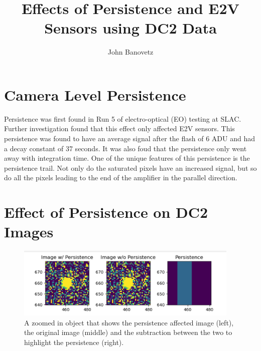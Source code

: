 \documentclass[DM,authoryear,toc]{lsstdoc}
\title{Effects of Persistence and E2V Sensors using DC2 Data}
\author{%
John Banovetz
}
\date{\vcsDate}
\begin{document}
\maketitle


\section{Camera Level Persistence}
Persistence was first found in Run 5 of electro-optical (EO) testing at SLAC. Further investigation found that this effect only affected E2V sensors. 
This persistence was found to have an average signal after the flash of 6 ADU and had a decay constant of 37 seconds. 
It was also foud that the persistence only went away with integration time. One of the unique features of this persistence is the persistence trail. 
Not only do the saturated pixels have an increased signal, but so do all the pixels leading to the end of the amplifier in the parallel direction.


\section{Effect of Persistence on DC2 Images}

\begin{figure}[!htp]
  \centering
  \includegraphics[width=0.95\textwidth, angle=0]{Obj_pers.png}
  \caption{
  A zoomed in object that shows the persistence affected image (left), the original image (middle) 
  and the subtraction between the two to highlight the persistence (right).
  }\label{fig:ex_persistence}
\end{figure}
\end{document}
